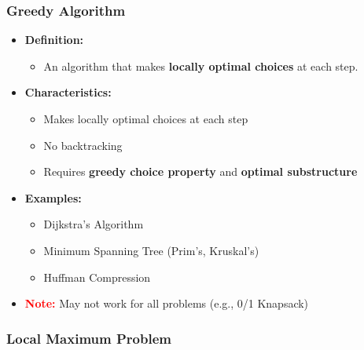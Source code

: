 \documentclass[10pt,aspectratio=43]{beamer}
\begin{document}
\begin{frame}
    \frametitle{Greedy Algorithm}
    \begin{itemize}
    \item \textcolor{myMaroon}{\textbf{Definition:}}
    \begin{itemize}
        \item An algorithm that makes \textbf{locally optimal choices} at each step.
    \end{itemize}
        
        \vspace{0.5cm}
        \item \textcolor{myMaroon}{\textbf{Characteristics:}}
        \begin{itemize}
            \item Makes locally optimal choices at each step
            \item No backtracking
            \item Requires \textbf{greedy choice property} and \textbf{optimal substructure}
        \end{itemize}
        
        \vspace{0.5cm}
        \item \textcolor{myMaroon}{\textbf{Examples:}}
        \begin{itemize}
            \item Dijkstra’s Algorithm
            \item Minimum Spanning Tree (Prim’s, Kruskal’s)
            \item Huffman Compression
        \end{itemize}
        
        \vspace{0.5cm}
        \item \textcolor{red}{\textbf{Note:}} May not work for all problems (e.g., 0/1 Knapsack)
    \end{itemize}
    
\end{frame}




\begin{frame}
    \frametitle{Local Maximum Problem}
\begin{center}
\end{center}
\end{frame}
\end{document}
